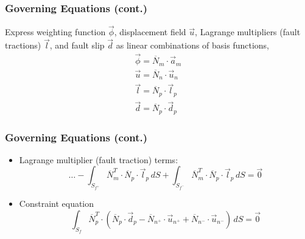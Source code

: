 \documentclass{beamer}
\newcommand{\tensor}[1]{\overline{#1}}
\begin{document}
\begin{frame}
  \frametitle{Governing Equations (cont.)}
  \summary{}

  Express weighting function $\vec{\phi}$, displacement field
  $\vec{u}$, Lagrange multipliers (fault tractions) $\vec{l}$, and
  fault slip $\vec{d}$ as
  linear combinations of basis functions,
  \begin{gather}
    \vec{\phi} = \tensor{N}_m \cdot \vec{a}_m \\
    \vec{u} = \tensor{N}_n \cdot \vec{u}_n \\
    \vec{l} = \tensor{N}_p \cdot \vec{l}_p \\
    \vec{d} = \tensor{N}_p \cdot \vec{d}_p
  \end{gather}

\end{frame}


\begin{frame}
  \frametitle{Governing Equations (cont.)}
  \summary{}

  \begin{itemize}
  \item Lagrange multiplier (fault traction) terms:
    \begin{equation}
      \ldots 
      - \int_{S_{f^+}} \tensor{N}_m^T \cdot \tensor{N}_p \cdot \vec{l}_p \, dS
      + \int_{S_{f^-}} \tensor{N}_m^T \cdot \tensor{N}_p \cdot \vec{l}_p \, dS
      = \vec{0}
    \end{equation}
  \item Constraint equation
    \begin{equation}
      \int_{S_f} \tensor{N}_p^T \cdot 
      \left( \tensor{N}_p \cdot \vec{d}_p
        - \tensor{N}_{n^+} \cdot \vec{u}_{n^+} 
        + \tensor{N}_{n^-} \cdot \vec{u}_{n^-}
      \right) \, dS = \vec{0}
    \end{equation}
  \end{itemize}

\end{frame}
\end{document}

